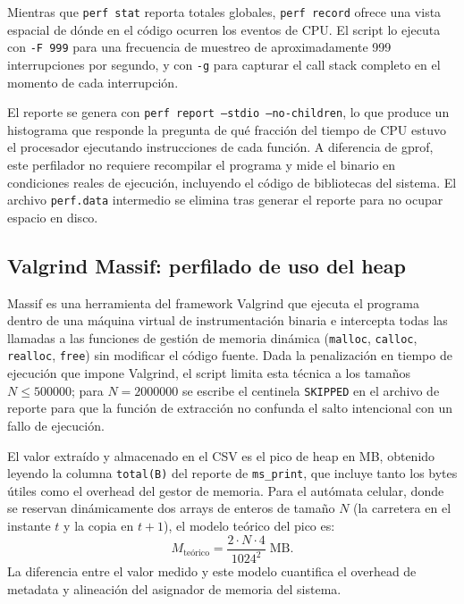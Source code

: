 Mientras que \texttt{perf stat} reporta totales globales, \texttt{perf record}
ofrece una vista espacial de dónde en el código ocurren los eventos de CPU.
El script lo ejecuta con \texttt{-F 999} para una frecuencia de muestreo de
aproximadamente 999 interrupciones por segundo, y con \texttt{-g} para capturar el
call stack completo en el momento de cada interrupción.

El reporte se genera con \texttt{perf report --stdio --no-children}, lo que produce
un histograma que responde la pregunta de qué fracción del tiempo de CPU estuvo el
procesador ejecutando instrucciones de cada función.
A diferencia de gprof, este perfilador no requiere recompilar el programa y mide el
binario en condiciones reales de ejecución, incluyendo el código de bibliotecas del
sistema.
El archivo \texttt{perf.data} intermedio se elimina tras generar el reporte para no
ocupar espacio en disco.


\subsection{Valgrind Massif: perfilado de uso del heap}

Massif es una herramienta del framework Valgrind que ejecuta el programa dentro de
una máquina virtual de instrumentación binaria e intercepta todas las llamadas a las
funciones de gestión de memoria dinámica (\texttt{malloc}, \texttt{calloc},
\texttt{realloc}, \texttt{free}) sin modificar el código fuente.
Dada la penalización en tiempo de ejecución que impone Valgrind, el script limita
esta técnica a los tamaños $N \leq 500000$; para $N = 2000000$ se escribe el
centinela \texttt{SKIPPED} en el archivo de reporte para que la función de
extracción no confunda el salto intencional con un fallo de ejecución.

El valor extraído y almacenado en el CSV es el pico de heap en MB, obtenido leyendo
la columna \texttt{total(B)} del reporte de \texttt{ms\_print}, que incluye tanto
los bytes útiles como el overhead del gestor de memoria.
Para el autómata celular, donde se reservan dinámicamente dos arrays de enteros de
tamaño $N$ (la carretera en el instante $t$ y la copia en $t+1$), el modelo
teórico del pico es:
\begin{equation}
    M_{\text{teórico}} = \frac{2 \cdot N \cdot 4}{1024^2} \;\text{MB}.
\end{equation}
La diferencia entre el valor medido y este modelo cuantifica el overhead de metadata
y alineación del asignador de memoria del sistema.


